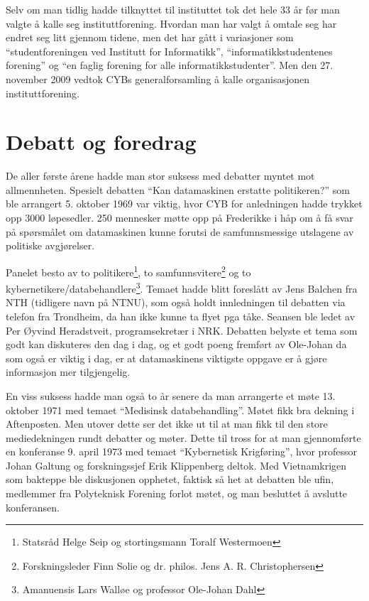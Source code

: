 Selv om man tidlig hadde tilknyttet til instituttet tok det hele 33 år før man valgte å kalle seg instituttforening. Hvordan man har valgt å omtale seg har endret seg litt gjennom tidene, men det har gått i variasjoner som ``studentforeningen ved Institutt for Informatikk'', ``informatikkstudentenes forening'' og ``en faglig forening for alle informatikkstudenter''. Men den 27. november 2009 vedtok CYBs generalforsamling å kalle organisasjonen instituttforening.

\section{Debatt og foredrag}

De aller første årene hadde man stor suksess med debatter myntet mot allmennheten. Spesielt debatten ``Kan datamaskinen erstatte politikeren?'' som ble arrangert 5. oktober 1969 var viktig, hvor CYB for anledningen hadde trykket opp 3000 løpesedler. 250 mennesker møtte opp på Frederikke i håp om å få svar på spørsmålet om datamaskinen kunne forutsi de samfunnsmessige utslagene av politiske avgjørelser. 

Panelet besto av to politikere\footnote{Statsråd Helge Seip og stortingsmann Toralf Westermoen}, to samfunnsvitere\footnote{Forskningsleder Finn Solie og dr. philos. Jens A. R. Christophersen} og to kybernetikere/databehandlere\footnote{Amanuensis Lars Walløe og professor Ole-Johan Dahl}. Temaet hadde blitt foreslått av Jens Balchen fra NTH (tidligere navn på NTNU), som også holdt innledningen til debatten via telefon fra Trondheim, da han ikke kunne ta flyet pga tåke. Seansen ble ledet av Per Øyvind Heradstveit, programsekretær i NRK. Debatten belyste et tema som godt kan diskuteres den dag i dag, og et godt poeng fremført av Ole-Johan da som også er viktig i dag, er at datamaskinens viktigste oppgave er å gjøre informasjon mer tilgjengelig.

En viss suksess hadde man også to år senere da man arrangerte et møte 13. oktober 1971 med temaet ``Medisinsk databehandling''. Møtet fikk bra dekning i Aftenposten. Men utover dette ser det ikke ut til at man fikk til den store mediedekningen rundt debatter og møter. Dette til tross for at man gjennomførte en konferanse 9. april 1973 med temaet ``Kybernetisk Krigføring'', hvor professor Johan Galtung og forskningssjef Erik Klippenberg deltok. Med Vietnamkrigen som bakteppe ble diskusjonen opphetet, faktisk så het at debatten ble ufin, medlemmer fra Polyteknisk Forening forlot møtet, og man besluttet å avslutte konferansen.

